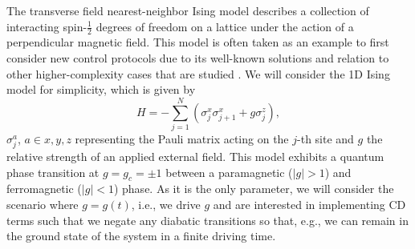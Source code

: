 The transverse field nearest-neighbor Ising model describes a collection of interacting spin-$\frac{1}{2}$ degrees of freedom on a lattice under the action of a perpendicular magnetic field. This model is often taken as an example to first consider new control protocols due to its well-known solutions and relation to other higher-complexity cases that are studied \cite{SachdevQPTs,DziarmagaPRL,Damski2006}. We will consider the 1D Ising model for simplicity, which is given by 
\begin{equation}\label{eq:Ising}
H = - \sum_{j=1}^N \left( \sigma^x_j \sigma^x_{j+1} + g \sigma_j^z\right),
\end{equation}
$\sigma_j^a$, $a \in {x,y,z} $ representing the Pauli matrix acting on the $j$-th site and $g$ the relative strength of an applied external field. This model exhibits a quantum phase transition at $g=g_c=\pm 1$ between a paramagnetic ($|g|>1$) and ferromagnetic ($|g|<1$) phase. As it is the only parameter, we will consider the scenario where $g=g(t)$, i.e., we drive $g$ and are interested in implementing CD terms such that we negate any diabatic transitions so that, e.g., we can remain in the ground state of the system in a finite driving time.

